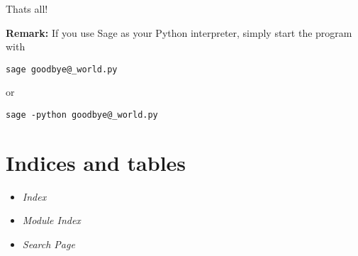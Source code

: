 \documentclass[letterpaper,10pt,english]{manual}
\begin{document}
Thats all!

\textbf{Remark:} If you use Sage as your Python interpreter, simply start the program with

\begin{Verbatim}[commandchars=@\[\]]
sage goodbye@_world.py
\end{Verbatim}

or

\begin{Verbatim}[commandchars=@\[\]]
sage -python goodbye@_world.py
\end{Verbatim}


\chapter{Indices and tables}
\begin{itemize}
\item {} 
\emph{Index}

\item {} 
\emph{Module Index}

\item {} 
\emph{Search Page}

\end{itemize}


\renewcommand{\indexname}{Module Index}
\printmodindex
\renewcommand{\indexname}{Index}
\printindex
\end{document}
